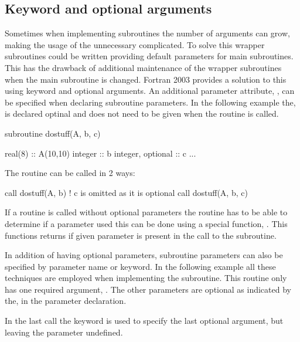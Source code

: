 \subsection{Keyword and optional arguments}

Sometimes when implementing subroutines the number of arguments can grow, making the usage of the unnecessary complicated. To solve this wrapper subroutines could be written providing default parameters for main subroutines. This has the drawback of additional maintenance of the wrapper subroutines when the main subroutine is changed. Fortran 2003 provides a solution to this using keyword and optional arguments. An additional parameter attribute, , can be specified when declaring subroutine parameters. In the following example the,  is declared optinal and does not need to be given when the routine is called.

\begin{fortrancodeenv}
subroutine dostuff(A, b, c)

	real(8) :: A(10,10)
	integer :: b
	integer, optional :: c
	...
	
\end{fortrancodeenv}

The  routine can be called in 2 ways:

\begin{fortrancodeenv}
call dostuff(A, b)    ! c is omitted as it is optional
call dostuff(A, b, c) 
\end{fortrancodeenv}

If a routine is called without optional parameters the routine has to be able to determine if a parameter used this can be done using a special function, . This functions returns  if given parameter is present in the call to the subroutine.

In addition of having optional parameters, subroutine parameters can also be specified by parameter name or keyword. In the following example all these techniques are employed when implementing the  subroutine. This routine only has one required argument, . The other parameters are optional as indicated by the,  in the parameter declaration.


In the last call the  keyword is used to specify the last optional argument, but leaving the  parameter undefined.

